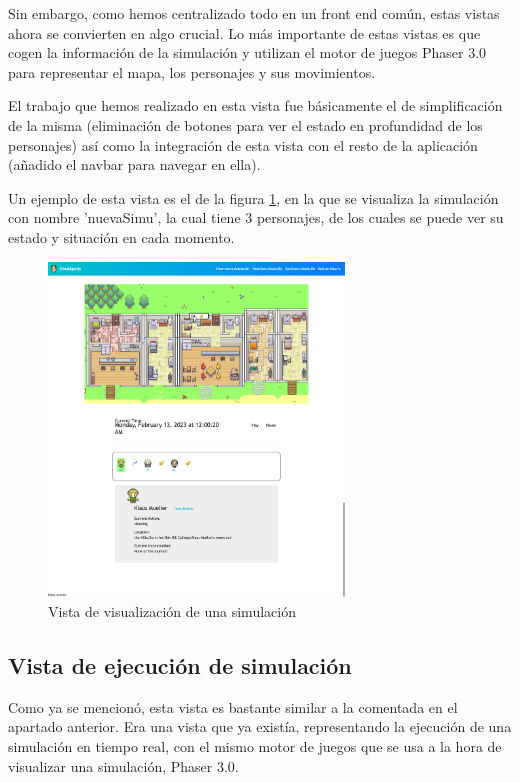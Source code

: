 Sin embargo, como hemos centralizado todo en un front end común, estas vistas ahora se convierten en algo crucial. Lo más importante de estas vistas es que cogen la información de la simulación y utilizan el motor de juegos Phaser 3.0 para representar el mapa, los personajes y sus movimientos.

El trabajo que hemos realizado en esta vista fue básicamente el de simplificación de la misma (eliminación de botones para ver el estado en profundidad de los personajes) así como la integración de esta vista con el resto de la aplicación (añadido el navbar para navegar en ella).

Un ejemplo de esta vista es el de la figura \ref{fig:verSim}, en la que se visualiza la simulación con nombre 'nuevaSimu', la cual tiene 3 personajes, de los cuales se puede ver su estado y situación en cada momento.

\begin{figure}[H]
	\centering
	\includegraphics[width = 0.7\textwidth]{Imagenes/Vectorial/vistaVerSim.png}
	\caption{Vista de visualización de una simulación}
	\label{fig:verSim}
\end{figure}


\subsection{Vista de ejecución de simulación}

Como ya se mencionó, esta vista es bastante similar a la comentada en el apartado anterior. Era una vista que ya existía, representando la ejecución de una simulación en tiempo real, con el mismo motor de juegos que se usa a la hora de visualizar una simulación, Phaser 3.0.


